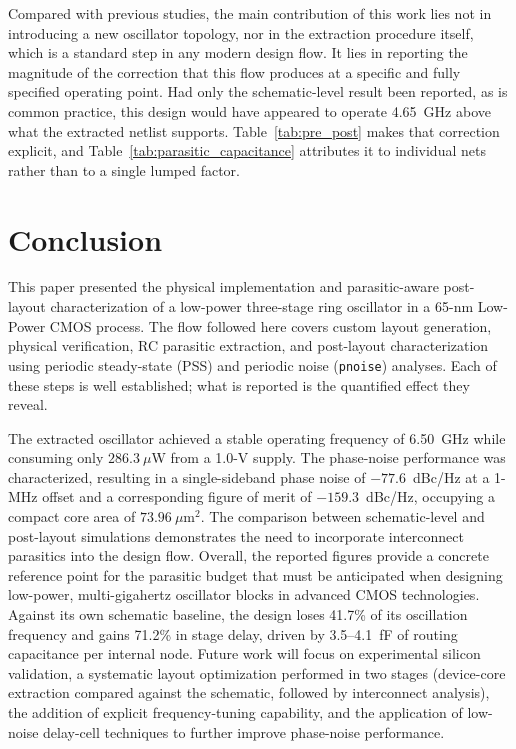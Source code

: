 \documentclass[conference,a4paper]{IEEEtran} %
\begin{document}
Compared with previous studies, the main contribution of this work lies not in
introducing a new oscillator topology, nor in the extraction procedure itself,
which is a standard step in any modern design flow. It lies in reporting the
magnitude of the correction that this flow produces at a specific and fully
specified operating point. Had only the schematic-level result been reported, as
is common practice, this design would have appeared to operate 4.65~GHz above
what the extracted netlist supports. Table~\ref{tab:pre_post} makes that
correction explicit, and Table~\ref{tab:parasitic_capacitance} attributes it to
individual nets rather than to a single lumped factor.

\section{Conclusion}
This paper presented the physical implementation and parasitic-aware post-layout
characterization of a low-power three-stage ring oscillator in a 65-nm Low-Power
CMOS process. The flow followed here covers custom layout generation, physical
verification, RC parasitic extraction, and post-layout characterization using
periodic steady-state (PSS) and periodic noise (\texttt{pnoise}) analyses. Each
of these steps is well established; what is reported is the quantified effect
they reveal.

The extracted oscillator achieved a stable operating frequency of 6.50~GHz while
consuming only $286.3~\mu$W from a 1.0-V supply. The phase-noise performance was
characterized, resulting in a single-sideband phase noise of $-77.6$~dBc/Hz at a
1-MHz offset and a corresponding figure of merit of $-159.3$~dBc/Hz, occupying a
compact core area of $73.96~\mu\text{m}^2$.
The comparison between schematic-level and post-layout simulations demonstrates
the need to incorporate interconnect parasitics into the design flow. Overall,
the reported figures provide a concrete reference point for the parasitic budget
that must be anticipated when designing low-power, multi-gigahertz oscillator
blocks in advanced CMOS technologies. Against its own schematic baseline, the
design loses 41.7\% of its oscillation frequency and gains 71.2\% in stage
delay, driven by 3.5--4.1~fF of routing capacitance per internal node. Future
work will focus on experimental silicon validation, a systematic layout
optimization performed in two stages (device-core extraction compared against
the schematic, followed by interconnect analysis), the addition of explicit
frequency-tuning capability, and the application of low-noise delay-cell
techniques to further improve phase-noise performance.
\end{document}
